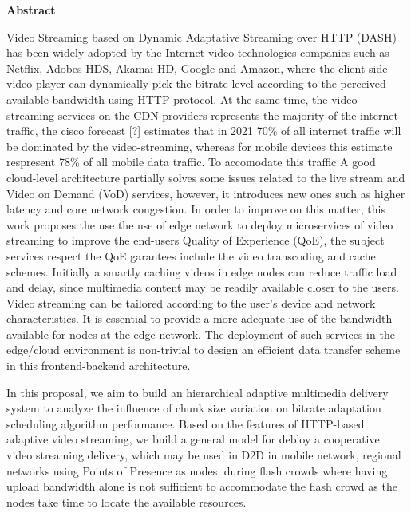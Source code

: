 \begin{center}
	{\bf Abstract}
\end{center}

Video Streaming based on Dynamic Adaptative Streaming over HTTP (DASH) has been widely adopted by the Internet video technologies companies such as Netflix, Adobes HDS, Akamai HD, Google and Amazon, where the client-side video player can dynamically pick the bitrate level according to the perceived available bandwidth using HTTP protocol. 
At the same time, the video streaming services on the CDN providers represents the majority of the internet traffic, the cisco forecast [?] estimates that in 2021 70\% of all internet traffic will be dominated by the video-streaming, whereas for mobile devices this estimate respresent 78\% of all mobile data traffic. To accomodate this traffic %
A good cloud-level architecture partially solves some issues related to the live stream and Video on Demand (VoD) services,%
however, it introduces new ones such as higher latency and core network congestion. 
In order to improve on this matter, this work proposes the use the use of edge network to deploy microservices of video streaming to improve the end-users Quality of Experience (QoE), the subject services respect the QoE garantees include the video transcoding and cache schemes. 
Initially a smartly caching videos in edge nodes can reduce traffic load and delay, since multimedia content may be readily available closer to the users. Video streaming can be tailored according to the user’s device and network characteristics. It is essential to provide a more adequate use of the bandwidth available for nodes at the edge network.%
The deployment of such services in the edge/cloud environment is non-trivial to design an efficient data transfer scheme in this frontend-backend architecture.

In this proposal, we aim to build an hierarchical adaptive multimedia delivery system to analyze the influence of chunk size variation on bitrate adaptation scheduling algorithm performance. Based on the features of HTTP-based adaptive video streaming, we build a general model for debloy a cooperative video streaming delivery, which may be used in D2D in mobile network, regional networks using Points of Presence as nodes, during flash crowds where having upload bandwidth alone is not sufficient to accommodate the flash crowd as the nodes take time to locate the available resources.


